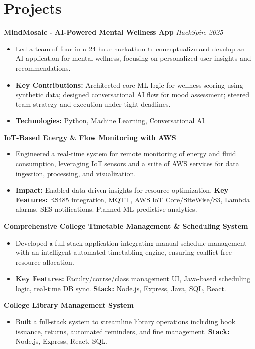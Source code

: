 \documentclass[10pt,a4paper]{article}
\begin{document}
\section*{Projects}
\textbf{MindMosaic - AI-Powered Mental Wellness App} \hfill \textit{HackSpire 2025}
\begin{itemize}
    \item Led a team of four in a 24-hour hackathon to conceptualize and develop an AI application for mental wellness, focusing on personalized user insights and recommendations.
    \item \textbf{Key Contributions:} Architected core ML logic for wellness scoring using synthetic data; designed conversational AI flow for mood assessment; steered team strategy and execution under tight deadlines.
    \item \textbf{Technologies:} Python, Machine Learning, Conversational AI.
\end{itemize}

\textbf{IoT-Based Energy \& Flow Monitoring with AWS} 
\begin{itemize}
    \item Engineered a real-time system for remote monitoring of energy and fluid consumption, leveraging IoT sensors and a suite of AWS services for data ingestion, processing, and visualization.
    \item \textbf{Impact:} Enabled data-driven insights for resource optimization. \textbf{Key Features:} RS485 integration, MQTT, AWS IoT Core/SiteWise/S3, Lambda alarms, SES notifications. Planned ML predictive analytics.
\end{itemize}

\textbf{Comprehensive College Timetable Management \& Scheduling System}
\begin{itemize}
    \item Developed a full-stack application integrating manual schedule management with an intelligent automated timetabling engine, ensuring conflict-free resource allocation.
    \item \textbf{Key Features:} Faculty/course/class management UI, Java-based scheduling logic, real-time DB sync. \textbf{Stack:} Node.js, Express, Java, SQL, React.
\end{itemize}

\textbf{College Library Management System}
\begin{itemize}
    \item Built a full-stack system to streamline library operations including book issuance, returns, automated reminders, and fine management. \textbf{Stack:} Node.js, Express, React, SQL.
\end{itemize}
\end{document}
